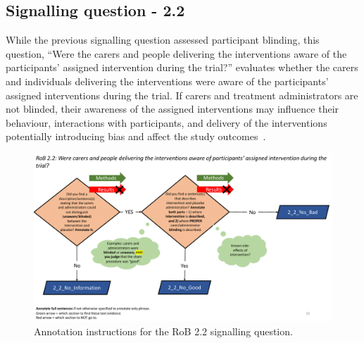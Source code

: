 \documentclass[sn-mathphys,Numbered]{sn-jnl}%
\begin{document}
\subsection*{Signalling question - 2.2}
\label{subsec:2_2}
%
While the previous signalling question assessed participant blinding, this question, ``Were the carers and people delivering the interventions aware of the participants' assigned intervention during the trial?'' evaluates whether the carers and individuals delivering the interventions were aware of the participants' assigned interventions during the trial.
If carers and treatment administrators are not blinded, their awareness of the assigned interventions may influence their behaviour, interactions with participants, and delivery of the interventions potentially introducing bias and affect the study outcomes~\cite{hrobjartsson2011blinding}.



%
%
%
\begin{figure}[hbt]
    \centering
    \includegraphics[width=\textwidth]{figures/2_2.pdf}
    \caption{Annotation instructions for the RoB 2.2 signalling question.}
    \label{fig:2_2}
\end{figure}
%
%
%
\end{document}
